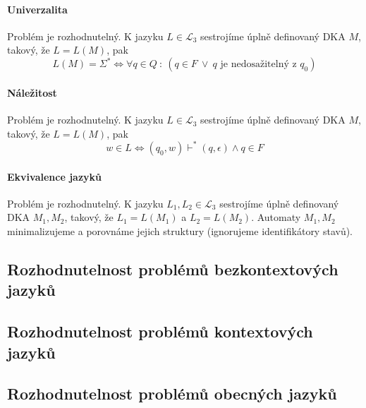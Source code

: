 \paragraph*{Univerzalita} Problém je rozhodnutelný. K jazyku $L \in \mathcal{L}_3$ sestrojíme úplně definovaný DKA $M$, takový, že $L = L(M)$, pak $$ L(M) = \Sigma^* \Leftrightarrow \forall q \in Q ~:~ (q \in F ~\lor~ q \text{ je nedosažitelný z } q_0 )$$

\paragraph*{Náležitost} Problém je rozhodnutelný. K jazyku $L \in \mathcal{L}_3$ sestrojíme úplně definovaný DKA $M$, takový, že $L = L(M)$, pak $$ w \in L \Leftrightarrow (q_0, w) \vdash^* (q, \epsilon) \land q \in F $$

\paragraph*{Ekvivalence jazyků} Problém je rozhodnutelný. K jazyku $L_1, L_2 \in \mathcal{L}_3$ sestrojíme úplně definovaný DKA $M_1, M_2$, takový, že $L_1 = L(M_1)$ a $L_2 = L(M_2)$. Automaty $M_1, M_2$ minimalizujeme a porovnáme jejich struktury (ignorujeme identifikátory stavů).

\subsection{Rozhodnutelnost problémů bezkontextových jazyků}


\subsection{Rozhodnutelnost problémů kontextových jazyků}


\subsection{Rozhodnutelnost problémů obecných jazyků}





